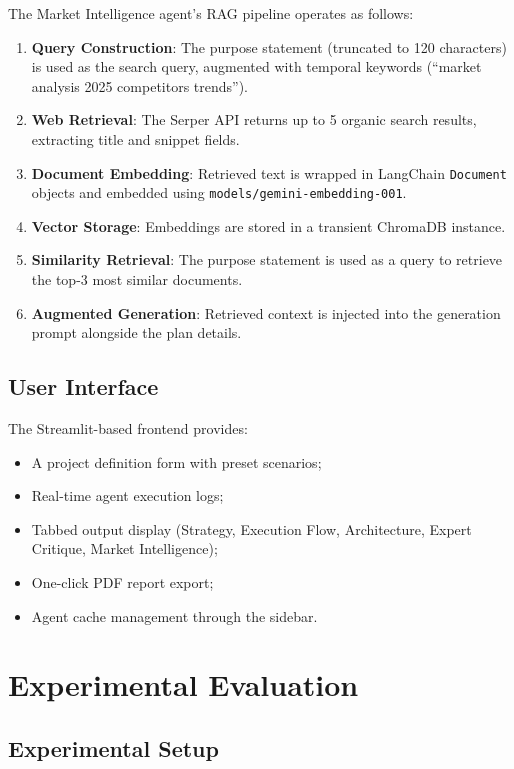\documentclass[journal]{IEEEtran}
\begin{document}
The Market Intelligence agent's RAG pipeline operates as follows:

\begin{enumerate}
    \item \textbf{Query Construction}: The purpose statement (truncated to 120 characters) is used as the search query, augmented with temporal keywords (``market analysis 2025 competitors trends'').
    \item \textbf{Web Retrieval}: The Serper API returns up to 5 organic search results, extracting title and snippet fields.
    \item \textbf{Document Embedding}: Retrieved text is wrapped in LangChain \texttt{Document} objects and embedded using \texttt{models/gemini-embedding-001}.
    \item \textbf{Vector Storage}: Embeddings are stored in a transient ChromaDB instance.
    \item \textbf{Similarity Retrieval}: The purpose statement is used as a query to retrieve the top-3 most similar documents.
    \item \textbf{Augmented Generation}: Retrieved context is injected into the generation prompt alongside the plan details.
\end{enumerate}

\subsection{User Interface}

The Streamlit-based frontend provides:
\begin{itemize}
    \item A project definition form with preset scenarios;
    \item Real-time agent execution logs;
    \item Tabbed output display (Strategy, Execution Flow, Architecture, Expert Critique, Market Intelligence);
    \item One-click PDF report export;
    \item Agent cache management through the sidebar.
\end{itemize}

\section{Experimental Evaluation}
\label{sec:evaluation}

\subsection{Experimental Setup}
\end{document}

